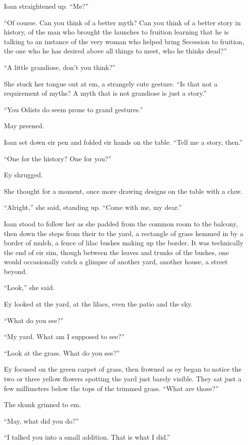 Ioan straightened up. ``Me?''

``Of course. Can you think of a better myth? Can you think of a better story in history, of the man who brought the launches to fruition learning that he is talking to an instance of the very woman who helped bring Secession to fruition, the one who he has desired above all things to meet, who he thinks dead?''

``A little grandiose, don't you think?''

She stuck her tongue out at em, a strangely cute gesture. ``Is that not a requirement of myths? A myth that is not grandiose is just a story.''

``You Odists do seem prone to grand gestures.''

May preened.

Ioan set down eir pen and folded eir hands on the table. ``Tell me a story, then.''

``One for the history? One for you?''

Ey shrugged.

She thought for a moment, once more drawing designs on the table with a claw.

``Alright,'' she said, standing up. ``Come with me, my dear.''

Ioan stood to follow her as she padded from the common room to the balcony, then down the steps from their to the yard, a rectangle of grass hemmed in by a border of mulch, a fence of lilac bushes making up the border. It was technically the end of eir sim, though between the leaves and trunks of the bushes, one would occasionally catch a glimpse of another yard, another house, a street beyond.

``Look,'' she said.

Ey looked at the yard, at the lilacs, even the patio and the sky.

``What do you see?''

``My yard. What am I supposed to see?''

``Look at the grass. What do you see?''

Ey focused on the green carpet of grass, then frowned as ey began to notice the two or three yellow flowers spotting the yard just barely visible. They sat just a few millimeters below the tops of the trimmed grass. ``What are those?''

The skunk grinned to em.

``May, what did you do?''

``I talked you into a small addition. That is what I did.''

